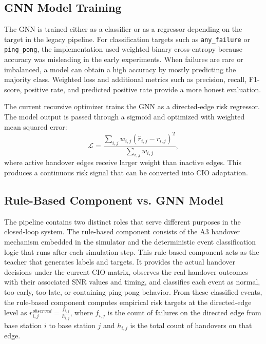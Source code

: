 \documentclass[11pt,a4paper]{article}
\begin{document}
\subsection{GNN Model Training}
The GNN is trained either as a classifier or as a regressor depending on the target in the legacy pipeline. For classification targets such as \texttt{any\_failure} or \texttt{ping\_pong}, the implementation used weighted binary cross-entropy because accuracy was misleading in the early experiments. When failures are rare or imbalanced, a model can obtain a high accuracy by mostly predicting the majority class. Weighted loss and additional metrics such as precision, recall, F1-score, positive rate, and predicted positive rate provide a more honest evaluation.

The current recursive optimizer trains the GNN as a directed-edge risk regressor. The model output is passed through a sigmoid and optimized with weighted mean squared error:
\begin{equation}
\mathcal{L}=\frac{\sum_{i,j}w_{i,j}(\hat r_{i,j}-r_{i,j})^2}{\sum_{i,j}w_{i,j}},
\end{equation}
where active handover edges receive larger weight than inactive edges. This produces a continuous risk signal that can be converted into CIO adaptation.

\subsection{Rule-Based Component vs. GNN Model}
The pipeline contains two distinct roles that serve different purposes in the closed-loop system. The rule-based component consists of the A3 handover mechanism embedded in the simulator and the deterministic event classification logic that runs after each simulation step. This rule-based component acts as the teacher that generates labels and targets. It provides the actual handover decisions under the current CIO matrix, observes the real handover outcomes with their associated SNR values and timing, and classifies each event as normal, too-early, too-late, or containing ping-pong behavior. From these classified events, the rule-based component computes empirical risk targets at the directed-edge level as $r_{i,j}^{observed} = \frac{f_{i,j}}{h_{i,j}}$, where $f_{i,j}$ is the count of failures on the directed edge from base station $i$ to base station $j$ and $h_{i,j}$ is the total count of handovers on that edge.
\end{document}
